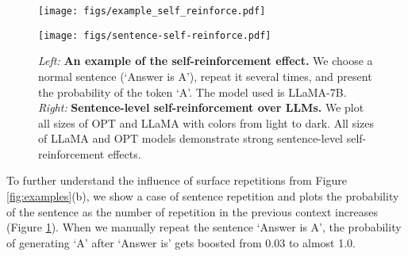 \documentclass{article} %
\begin{document}

\begin{figure}[t]
\centering
\begin{minipage}[b]{0.43\textwidth}
  \centering
  \texttt{[image: figs/example\_self\_reinforce.pdf]}
\end{minipage}%
\hfill
\begin{minipage}[b]{0.43\textwidth}
  \centering
  \texttt{[image: figs/sentence-self-reinforce.pdf]}
\end{minipage}
\caption{\emph{Left: }\textbf{An example of the self-reinforcement effect.}  We choose a normal sentence (`Answer is {\color{red}A}'), repeat it several times, and present the probability of the token {\color{red}`A'}. The model used is LLaMA-7B. \emph{Right: }\textbf{Sentence-level self-reinforcement over LLMs.} We plot all sizes of OPT and LLaMA with colors from light to dark. All sizes of LLaMA and OPT models demonstrate strong sentence-level self-reinforcement effects. }
\label{fig:sentence-self-reinforce}
\end{figure}


To further understand the influence of surface repetitions from Figure \ref{fig:examples}(b), we show a case of sentence repetition and plots the probability of the sentence as the number of repetition in the previous context increases (Figure \ref{fig:sentence-self-reinforce}).
When we manually repeat the sentence `Answer is A', the probability of generating `A' after `Answer is' gets boosted from 0.03 to almost 1.0. 
\end{document}
